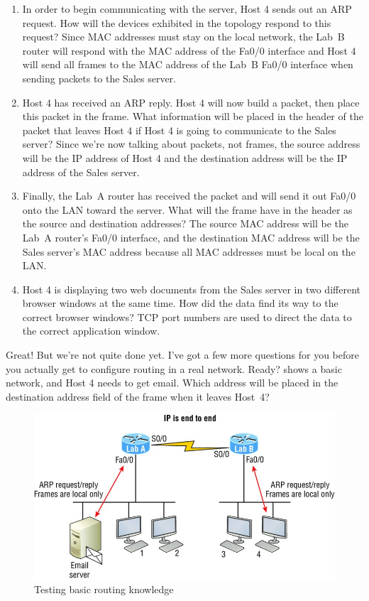 \begin{enumerate}
\item
  In order to begin communicating with the server, Host 4 sends out an
  ARP request. How will the devices exhibited in the topology respond to
  this request? Since MAC addresses must stay on the local network, the
  Lab~B router will respond with the MAC address of the Fa0/0 interface
  and Host 4 will send all frames to the MAC address of the Lab~B Fa0/0
  interface when sending packets to the Sales server.
\item
  Host 4 has received an ARP reply. Host 4 will now build a packet, then
  place this packet in the frame. What information will be placed in the
  header of the packet that leaves Host 4 if Host 4 is going to
  communicate to the Sales server? Since we're now talking about
  packets, not frames, the source address will be the IP address of Host
  4 and the destination address will be the IP address of the Sales
  server.
\item
  Finally, the Lab~A router has received the packet and will send it
  out Fa0/0 onto the LAN toward the server. What will the frame have in
  the header as the source and ­destination addresses? The source MAC
  address will be the Lab~A router's Fa0/0 interface, and the
  \protect\hypertarget{c09.xhtmlux5cux23Page_371}{}{}destination MAC
  address will be the Sales server's MAC address because all MAC
  addresses must be local on the LAN.
\item
  Host 4 is displaying two web documents from the Sales server in two
  different browser windows at the same time. How did the data find its
  way to the correct browser windows? TCP port numbers are used to
  direct the data to the correct application window.
\end{enumerate}

Great! But we're not quite done yet. I've got a few more questions for
you before you actually get to configure routing in a real network.
Ready?
 shows a basic network, and Host 4 needs to get email.
Which address will be placed in the destination address field of the frame when it leaves Host~4?

\begin{figure}
   \centering
   \includegraphics{images/c09f007.jpg}
   \caption{Testing basic routing knowledge}
   \label{fig:basic-routing-test}
\end{figure}

